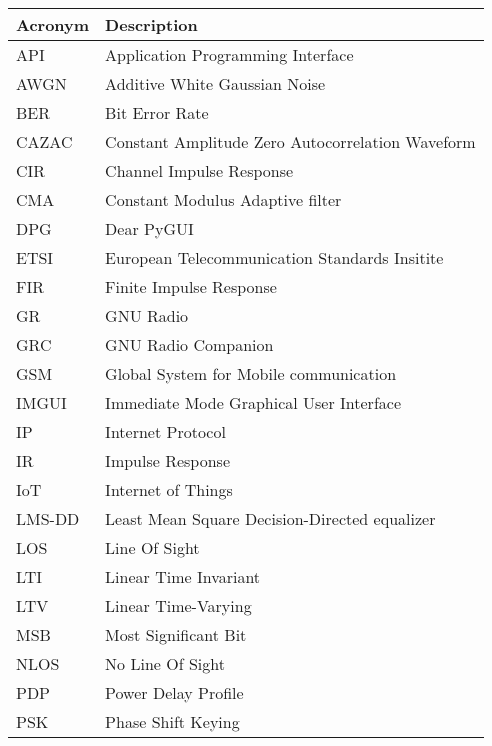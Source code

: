 \documentclass[
	overfullrule,
	paper = a4, twoside, openright, BCOR = 5mm,
	headinclude, footexclude,
	fontsize = 11pt,
	cleardoublepage = empty,
	titlepage, abstract = on,
	automark,
	numbers = noenddot
]{scrreprt}
\begin{document}
	\begin{tabularx}{\linewidth}{l X}
		\toprule
		\bfseries Acronym & \bfseries Description \\
		\midrule
		API    & Application Programming Interface                \\
		AWGN   & Additive White Gaussian Noise                    \\
		BER    & Bit Error Rate                                   \\
		CAZAC  & Constant Amplitude Zero Autocorrelation Waveform \\
		CIR    & Channel Impulse Response                         \\
		CMA    & Constant Modulus Adaptive filter                 \\
		DPG    & Dear PyGUI                                       \\
		ETSI   & European Telecommunication Standards Insitite    \\
		FIR    & Finite Impulse Response                          \\
		GR     & GNU Radio                                        \\
		GRC    & GNU Radio Companion                              \\
		GSM    & Global System for Mobile communication           \\
		IMGUI  & Immediate Mode Graphical User Interface          \\
		IP     & Internet Protocol                                \\
		IR     & Impulse Response                                 \\
		IoT    & Internet of Things                               \\
		LMS-DD & Least Mean Square Decision-Directed equalizer    \\
		LOS    & Line Of Sight                                    \\
		LTI    & Linear Time Invariant                            \\
		LTV    & Linear Time-Varying                              \\
		MSB    & Most Significant Bit                             \\
		NLOS   & No Line Of Sight                                 \\
		PDP    & Power Delay Profile                              \\
		PSK    & Phase Shift Keying                               \\

\end{tabularx}
\end{document}
